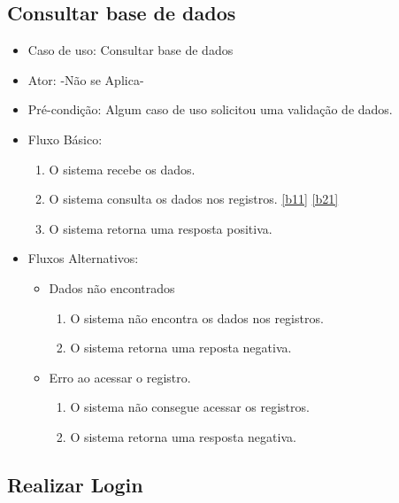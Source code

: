 \documentclass{utfpr-pg}
\begin{document}
     \subsection{Consultar base de dados} \label{consultadorbanco}
        \begin{itemize}
        \item Caso de uso: Consultar base de dados
        \item Ator: -Não se Aplica-
        \item Pré-condição: Algum caso de uso solicitou uma validação de dados.
        \item Fluxo Básico:
            \begin{enumerate}[label=\textbf{B0.\arabic*}]
                \item O sistema recebe os dados.
                \item O sistema consulta os dados nos registros. \ref{b11} \ref{b21}
                \item O sistema retorna uma resposta positiva.
            \end{enumerate}
        \item Fluxos Alternativos:
            \begin{itemize}
            \item Dados não encontrados 
            \begin{enumerate}[label=\textbf{B1.\arabic*}]
                \item \label{b11} O sistema não encontra os dados nos registros.
                \item O sistema retorna uma reposta negativa.
            \end{enumerate}
            
            \item Erro ao acessar o registro.
            \begin{enumerate}[label=\textbf{B2.\arabic*}]
                \item \label{b21} O sistema não consegue acessar os registros.
                \item O sistema retorna uma resposta negativa.
            \end{enumerate}
        \end{itemize}
        \end{itemize}
        
        
    \subsection{Realizar Login}
    
\end{document}
